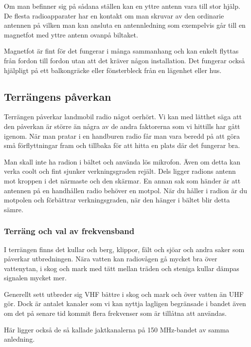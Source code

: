Om man befinner sig på sådana ställen kan en yttre antenn vara till stor hjälp. De flesta radioapparater har en kontakt om man skruvar av den ordinarie antennen på vilken man kan ansluta en antennledning som exempelvis går till en magnetfot med yttre antenn ovanpå biltaket.

Magnetfot är fint för det fungerar i många sammanhang och kan enkelt flyttas från fordon till fordon utan att det kräver någon installation. Det fungerar också hjälpligt på ett balkongräcke eller fönsterbleck från en lägenhet eller hus.


\subsection{Terrängens påverkan}

Terrängen påverkar landmobil radio något oerhört. Vi kan med lätthet säga att den påverkan är större än några av de andra faktorerna som vi hittills har gått igenom. När man pratar i en handburen radio får man vara beredd på att göra små förflyttningar fram och tillbaka för att hitta en plats där det fungerar bra.

Man skall inte ha radion i bältet och använda lös mikrofon. Även om detta kan verka coolt och fint sjunker verkningsgraden rejält. Dels ligger radions antenn mot kroppen i det närmaste och den skärmar. En annan sak som händer är att antennen på en handhållen radio behöver en motpol. När du håller i radion är du motpolen och förbättrar verkningsgraden, när den hänger i bältet blir detta sämre.

\subsubsection{Terräng och val av frekvensband}

I terrängen finns det kullar och berg, klippor, fält och sjöar och andra saker som påverkar utbredningen. Nära vatten kan radiovågen gå mycket bra över vattenytan, i skog och mark med tätt mellan träden och steniga kullar dämpas signalen mycket mer.

Generellt sett utbreder sig VHF bättre i skog och mark och över vatten än UHF gör. Dock är antalet kanaler som vi kan nyttja lagligen begränsade i bandet även om det på senare tid kommit flera frekvenser som är tillåtna att användas.

Här ligger också de så kallade jaktkanalerna på 150 MHz-bandet av samma anledning.

